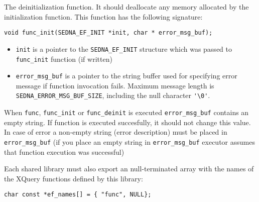 \documentclass[a4paper,12pt]{article}
\begin{document}
\begin{itemize}
The deinitialization function.
It should deallocate any memory allocated by the initialization function.
This function has the following signature:
\begin{verbatim}
void func_init(SEDNA_EF_INIT *init, char * error_msg_buf);
\end{verbatim}
\begin{itemize}
	\item \verb!init! is a pointer to the \verb!SEDNA_EF_INIT! structure which
		was passed to \verb!func_init! function (if written)
	\item \verb!error_msg_buf! is a pointer to the string buffer used for specifying error
		message if function invocation fails. Maximum message length is
		\verb!SEDNA_ERROR_MSG_BUF_SIZE!, including the null character \verb!'\0'!.
\end{itemize}

\end{itemize}

When \verb!func!, \verb!func_init! or \verb!func_deinit! is executed
\verb!error_msg_buf! contains an empty string. If function is executed
succesfully, it should not change this value. In case of error
a non-empty string (error description) must be placed in \verb!error_msg_buf!
(if you place an empty string in \verb!error_msg_buf! executor assumes
that function execution was successful)

Each shared library must also export an null-terminated array with the names
of the XQuery functions defined by this library:

\verb!char const *ef_names[] = { "func", NULL};!
\end{document}
